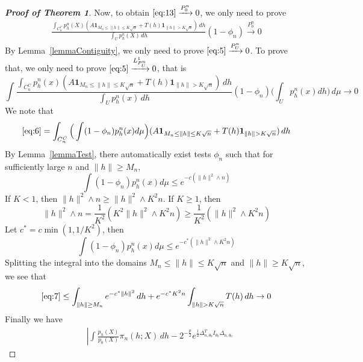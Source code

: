 \begin{proof}[\textbf{Proof of Theorem 1}]
Now, to obtain $\eqref{eq:13}\xrightarrow{P_0^n}0$, we only need to prove
\begin{equation}\label{eq:5}
    \begin{aligned}
        \frac{\int_{C_n^C}p_h^n(X)(A\textbf{1}_{M_n\leq \|h\|\leq K\sqrt{n}}+T(h)\textbf{1}_{\|h\|> K\sqrt{n}})\, dh}{\int_U p_h^n(X)\, dh}(1-\phi_n)\xrightarrow{P_0^n} 0
    \end{aligned}
\end{equation}
By Lemma~\ref{lemmaContiguity}, we only need to prove $\eqref{eq:5}\xrightarrow{P_U^n}0$. To prove that, we only need to prove $\eqref{eq:5}\xrightarrow{L^1_{P_U^n}}0$, that is 
\begin{equation}\label{eq:6}
    \int \frac{\int_{C_n^C}p_h^n(x)(A\textbf{1}_{M_n\leq \|h\|\leq K\sqrt{n}}+T(h)\textbf{1}_{\|h\|> K\sqrt{n}})\, dh}{\int_U p_h^n(x)\, dh}(1-\phi_n)\big(\int_U p_h^n(x)dh\big) \, d\mu  \to 0
\end{equation}
We note that
\begin{equation}\label{eq:7}
    \eqref{eq:6}=\int_{C_n^C} \Big(\int (1-\phi_n)p_h^n(x)d\mu\Big) (A\textbf{1}_{M_n\leq \|h\|\leq K\sqrt{n}}+T(h)\textbf{1}_{\|h\|> K\sqrt{n}})\, dh 
\end{equation}
By Lemma~\ref{lemmaTest}, there automatically exist tests $\phi_n$  such that for sufficiently large $n$ and $\|h\|\geq M_n$,
\begin{equation}
\int (1-\phi_n)p^n_h(x)d\mu\leq e^{-c(\|h\|^2\wedge n)}
\end{equation}
If $K< 1$, then $\|h\|^2\wedge n\geq \|h\|^2\wedge K^2n$. If $K\geq 1$, then
\begin{equation}
    \|h\|^2\wedge n=\frac{1}{K^2}(K^2\|h\|^2\wedge K^2n)\geq \frac{1}{K^2}(\|h\|^2\wedge K^2n)
\end{equation}
Let $c^*=c\min(1,1/K^2)$, then
\begin{equation}
\int (1-\phi_n)p^n_h(x)d\mu\leq e^{-c^*(\|h\|^2\wedge K^2n)}
\end{equation}
Splitting the integral into the domains $M_n\leq \|h\|\leq K\sqrt{n}$ and $\|h\|\geq K\sqrt{n}$, we see that
\begin{equation}
    \eqref{eq:7}\leq \int_{\|h\|\geq M_n}e^{-c^*\|h\|^2}\, dh + e^{-c^*K^2n}\int_{\|h\|>K\sqrt{n}} T(h)\, dh  \to 0
\end{equation}
Finally we have
\begin{equation}
    \begin{aligned}
        &\left|\int \frac{p_h(X)}{p_0(X)}\pi_n (h;X) \, dh-2^{-\frac{p}{2}}e^{\frac{1}{2}\Delta_{n,\theta_0}^TI_{\theta_0}\Delta_{n,\theta_0}}

\end{aligned}
\end{equation}
\end{proof}
